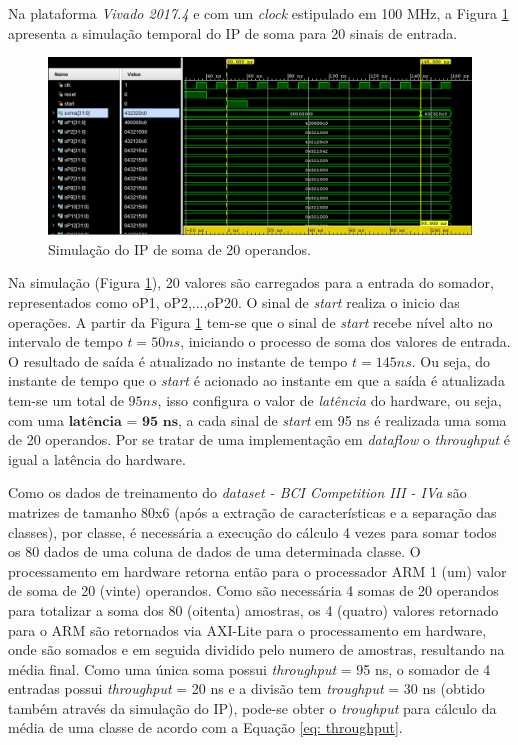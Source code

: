 Na plataforma \textit{Vivado 2017.4} e com um \textit{clock} estipulado em 100 MHz, a Figura \ref{simulacao_sum} apresenta a simulação temporal do IP de soma para 20 sinais de entrada.

\begin{figure}[!h]
	\centering
	\includegraphics[keepaspectratio=true,scale=0.5]{figuras/Simulacao_somatorio.PNG}
	\caption{Simulação do IP de soma de 20 operandos.}
	\label{simulacao_sum}
\end{figure}

Na simulação (Figura \ref{simulacao_sum}), 20 valores são carregados para a entrada do somador, representados como oP1, oP2,...,oP20. O sinal de \textit{start} realiza o inicio das operações. A partir da Figura \ref{simulacao_sum} tem-se que o sinal de \textit{start} recebe nível alto no intervalo de tempo $t = 50 ns$, iniciando o processo de soma dos valores de entrada. O resultado de saída é atualizado no instante de tempo $t = 145 ns$. Ou seja, do instante de tempo que o \textit{start} é acionado ao instante em que a saída é atualizada tem-se um total de $95 ns$, isso configura o valor de \textit{latência} do hardware, ou seja, com uma $\textbf{latência = 95 ns}$, a cada sinal de \textit{start} em 95 ns é realizada uma soma de 20 operandos. Por se tratar de uma implementação em \textit{dataflow} o \textit{throughput} é igual a latência do hardware. 

Como os dados de treinamento do \textit{dataset - BCI Competition III - IVa} são matrizes de tamanho 80x6 (após a extração de características e a separação das classes), por classe, é necessária a execução do cálculo 4 vezes para somar todos os 80 dados de uma coluna de dados de uma determinada classe. O processamento em hardware retorna então para o processador ARM 1 (um) valor de soma de 20 (vinte) operandos. Como são necessária 4 somas de 20 operandos para totalizar a soma dos 80 (oitenta) amostras, os 4 (quatro) valores retornado para o ARM são retornados via AXI-Lite para o processamento em hardware, onde são somados e em seguida dividido pelo numero de amostras, resultando na média final. Como uma única soma possui \textit{throughput} = 95 ns, o somador de 4 entradas possui \textit{throughput} = 20 ns e a divisão tem \textit{troughput} = 30 ns (obtido também através da simulação do IP), pode-se obter o \textit{troughput} para cálculo da média de uma classe de acordo com a Equação \ref{eq: throughput}.

